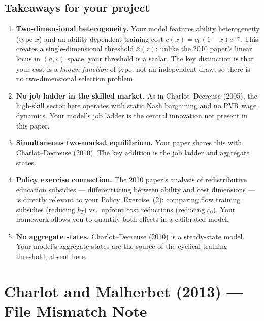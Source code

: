 \documentclass[12pt]{article}
\begin{document}
\subsection*{Takeaways for your project}

\begin{enumerate}
    \item \textbf{Two-dimensional heterogeneity.} Your model features ability heterogeneity (type $x$) and an ability-dependent training cost $c(x) = c_0(1-x)e^{-x}$. This creates a single-dimensional threshold $\bar{x}(z)$: unlike the 2010 paper's linear locus in $(a,c)$ space, your threshold is a scalar. The key distinction is that your cost is a \emph{known function} of type, not an independent draw, so there is no two-dimensional selection problem.

    \item \textbf{No job ladder in the skilled market.} As in Charlot--Decreuse (2005), the high-skill sector here operates with static Nash bargaining and no PVR wage dynamics. Your model's job ladder is the central innovation not present in this paper.

    \item \textbf{Simultaneous two-market equilibrium.} Your paper shares this with Charlot--Decreuse (2010). The key addition is the job ladder and aggregate states.

    \item \textbf{Policy exercise connection.} The 2010 paper's analysis of redistributive education subsidies --- differentiating between ability and cost dimensions --- is directly relevant to your Policy~Exercise~(2): comparing flow training subsidies (reducing $b_T$) vs.\ upfront cost reductions (reducing $c_0$). Your framework allows you to quantify both effects in a calibrated model.

    \item \textbf{No aggregate states.} Charlot--Decreuse (2010) is a steady-state model. Your model's aggregate states are the source of the cyclical training threshold, absent here.
\end{enumerate}


\section{Charlot and Malherbet (2013) --- File Mismatch Note}
\end{document}
